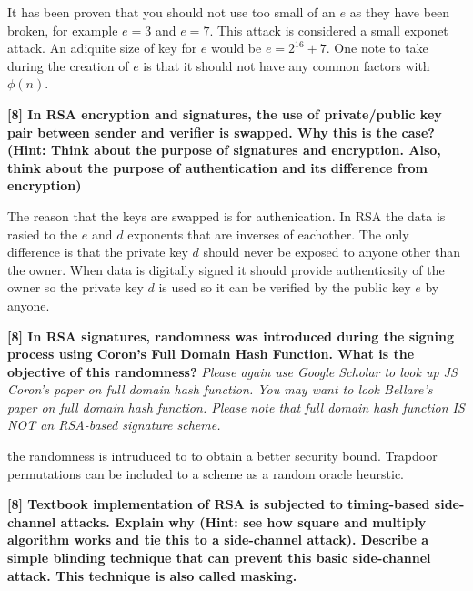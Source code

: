 \documentclass[letterpaper,11pt,notitlepage,fleqn]{article}
\begin{document}
It has been proven that you should not use too small of an $e$ as they have been broken, for example $e=3$ and $e=7$. This attack is considered a small exponet attack. An adiquite size of key for $e$ would be $e=2^{16}+7$. One note to take during the creation of $e$ is that it should not have any common factors with $\phi(n)$.   

\noindent \textbf{[8]  In  RSA  encryption  and  signatures,  the  use  of  private/public  key  pair  between sender  and  verifier  is  swapped.  Why  this  is  the  case?  (Hint:  Think  about  the purpose  of  signatures  and  encryption.  Also,  think  about  the  purpose  of authentication and its difference from encryption)}

The reason that the keys are swapped is for authenication. In RSA the data is rasied to the $e$ and $d$ exponents that are inverses of eachother. The only difference is that the private key $d$ should never be exposed to anyone other than the owner. When data is digitally signed it should provide authenticsity of the owner so the private key $d$ is used so it can be verified by the public key $e$ by anyone.  

\noindent \textbf{[8]  In  RSA  signatures,  randomness  was  introduced  during  the  signing  process using  Coron’s  Full  Domain  Hash  Function.  What  is  the  objective  of  this randomness?} \textit{Please again use Google Scholar to look up JS Coron’s paper on full domain hash  function. You may want  to  look Bellare’s paper on  full domain hash function.  Please  note  that  full  domain  hash  function  IS  NOT  an  RSA-based signature scheme.}

the randomness is intruduced to to obtain a better security bound. Trapdoor permutations can be included to a scheme as a random oracle heurstic.  


\noindent \textbf{[8]  Textbook  implementation  of  RSA    is  subjected  to  timing-based  side-channel attacks. Explain why  (Hint:  see how  square  and multiply  algorithm works  and  tie this  to  a  side-channel  attack).  Describe  a  simple  blinding  technique  that  can prevent this basic side-channel attack. This technique is also called masking.}
\end{document}
